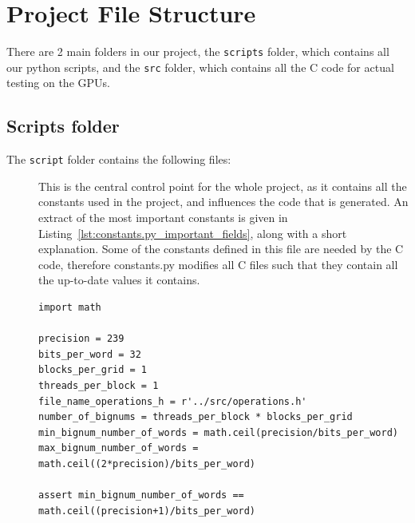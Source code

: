 \documentclass[12pt, a4paper]{report}
\begin{document}
\begin{sloppypar}
\section{Project File Structure}
There are 2 main folders in our project, the \verb+scripts+ folder, which
contains all our python scripts, and the \verb+src+ folder, which contains all
the C code for actual testing on the GPUs.

\subsection{Scripts folder}
The \verb+script+ folder contains the following files:

\begin{description}
\item[]
This is the central control point for the whole project, as it contains all the
constants used in the project, and influences the code that is generated.
An extract of the most important constants is given in
Listing~\ref{lst:constants.py_important_fields}, along with a short explanation.
Some of the constants defined in this file are needed by the C code, therefore
constants.py modifies all C files such that they contain all the up-to-date
values it contains.

\begin{lstlisting}
import math

precision = 239
bits_per_word = 32
blocks_per_grid = 1
threads_per_block = 1
file_name_operations_h = r'../src/operations.h'
number_of_bignums = threads_per_block * blocks_per_grid
min_bignum_number_of_words = math.ceil(precision/bits_per_word)
max_bignum_number_of_words = math.ceil((2*precision)/bits_per_word)

assert min_bignum_number_of_words == math.ceil((precision+1)/bits_per_word)
\end{lstlisting}


\end{description}
\end{sloppypar}
\end{document}
